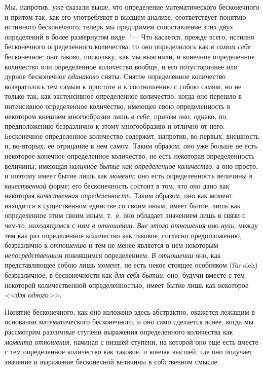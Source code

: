 Мы, напротив, уже сказали выше, что определение математического бесконечного
и притом так, как его употребляют в высшем анализе, соответствует понятию
истинного бесконечного; теперь мы предпримем сопоставление этих двух
определений в более развернутом виде. "--- Что касается, прежде всего, истинно
бесконечного определенного количества, то оно определилось как
{\em в самом себе} бесконечное; оно таково, поскольку,
как мы выяснили, и конечное определенное количество или определенное
количество вообще, и его потустороннее или дурное бесконечное
{\em одинаково} сняты. Снятое определенное количество
возвратилось тем самым к простоте и к соотношению с собою самим, но не
только так, как экстенсивное определенное количество, когда оно перешло в
интенсивное определенное количество, имеющее свою определенность в
некотором внешнем многообразии лишь {\em в себе},
причем оно, однако, по предположению безразлично к этому многообразию и
отлично от него. Бесконечное определенное количество содержит, напротив,
во-первых, внешность и, во-вторых, ее отрицание в нем самом. Таким образом,
оно уже больше не есть некоторое конечное определенное количество, не есть
некоторая определенность величины, имеющая
{\em наличное бытие как определенное количество}, а оно
просто, и поэтому имеет бытие лишь как {\em момент};
оно есть определенность величины в {\em качественной}
форме; его бесконечность состоит в том, что оно дано как некоторая
{\em качественная определенность}. Таким образом, оно
как момент находится в существенном единстве со своим иным, имеет бытие,
лишь как определенное этим своим иным, т.~е. оно обладает значением лишь
в связи с чем-то, находящимся с ним {\em в отношении}.
{\em Вне этого отношения} оно
{\em нуль}, между тем как раз определенное количество
как таковое, согласно предположению, безразлично к
{\em отношению} и тем не менее является в нем некоторым
{\em непосредственным} покоящимся определением.
{\em В отношении} оно, как представляющее собою лишь
момент, не есть некое стоящее особняком (für sich) безразличное; в
бесконечности как {\em для-себя-бытии}, оно, будучи
вместе с тем некоторой количественной определенностью, имеет бытие лишь как
некоторое {\em <<для одного>>}.

Понятие бесконечного, как оно изложено здесь абстрактно, окажется лежащим в
основании математического бесконечного, и оно само сделается яснее, когда
мы рассмотрим различные ступени выражения определенного количества как
{\em момента отношения}, начиная с низшей ступени, на
которой оно еще есть вместе с тем определенное количество как таковое, и
кончая высшей, где оно получает значение и выражение бесконечной величины в
собственном смысле.

